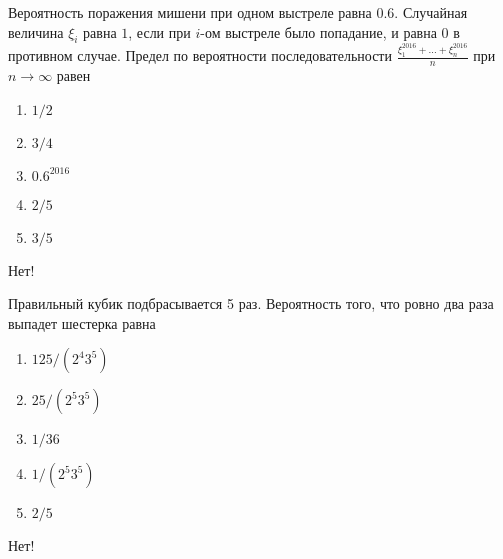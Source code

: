\documentclass[t]{beamer}
\begin{document}
 \begin{frame} \label{21-No} 
\begin{block}{21} 

  Вероятность поражения мишени при одном выстреле равна $0.6$. Случайная величина $\xi_i$  равна $1$, если при $i$-ом выстреле было попадание, и равна $0$ в противном случае. Предел по вероятности последовательности $\frac{\xi_1^{2016} + \ldots + \xi_n^{2016}}{n}$ при $n \rightarrow \infty$ равен
  


 \end{block} 
\begin{enumerate} 
\item[] \hyperlink{21-No}{\beamergotobutton{} $1/2$}
\item[] \hyperlink{21-No}{\beamergotobutton{} $3/4$}
\item[] \hyperlink{21-No}{\beamergotobutton{} $0.6^2016$}
\item[] \hyperlink{21-No}{\beamergotobutton{} $2/5$}
\item[] \hyperlink{21-Yes}{\beamergotobutton{} $3/5$}
\end{enumerate} 

 \alert{Нет!} 
\end{frame} 


 \begin{frame} \label{22-No} 
\begin{block}{22} 

  Правильный кубик подбрасывается 5 раз. Вероятность того, что ровно два раза выпадет шестерка равна
  


 \end{block} 
\begin{enumerate} 
\item[] \hyperlink{22-No}{\beamergotobutton{} $125/(2^4 3^5)$}
\item[] \hyperlink{22-No}{\beamergotobutton{} $25/(2^5 3^5)$}
\item[] \hyperlink{22-No}{\beamergotobutton{} $1/36$}
\item[] \hyperlink{22-No}{\beamergotobutton{} $1/(2^5 3^5)$}
\item[] \hyperlink{22-No}{\beamergotobutton{} $2/5$}
\end{enumerate} 

 \alert{Нет!} 
\end{frame} 
\end{document}
